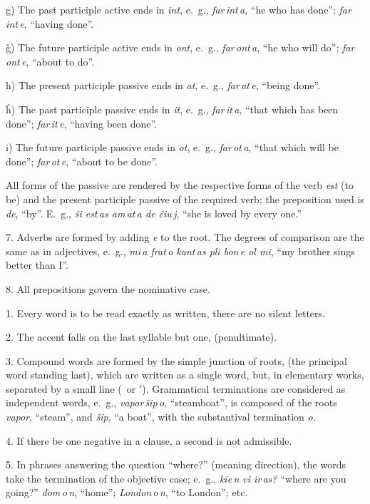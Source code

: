 g) The past participle active ends in \emph{int}, e.~g., \emph{far\,int\,a}, “he who has done”; \emph{far\,int\,e}, “having done”.

ĝ) The future participle active ends in \emph{ont}, e.~g., \emph{far\,ont\,a}, “he who will do”; \emph{far\,ont\,e}, “about to do”.

h) The present participle passive ends in \emph{at}, e.~g., \emph{far\,at\,e}, “being done”.

ĥ) The past participle passive ends in \emph{it}, e.~g., \emph{far\,it\,a}, “that which has been done”; \emph{far\,it\,e}, “having been done”.

i) The future participle passive ends in \emph{ot}, e.~g., \emph{far\,ot\,a}, “that which will be done”; \emph{far\,ot\,e}, “about to be done”.

All forms of the passive are rendered by the respective forms of the verb \emph{est} (to be) and the present participle passive of the required verb; the preposition used is \emph{de}, “by”. E.~g., \emph{ŝi est\,as am\,at\,a de ĉiu\,j}, “she is loved by every one.”

7. Adverbs are formed by adding \emph{e} to the root. The degrees of comparison are the same as in adjectives, e.~g., \emph{mi\,a frat\,o kant\,as pli bon\,e ol mi}, “my brother sings better than I”.

8. All prepositions govern the nominative case.

%
%

1. Every word is to be read exactly as written, there are no silent letters.

2. The accent falls on the last syllable but one, (penultimate).

3. Compound words are formed by the simple junction of roots, (the principal word standing last), which are written as a single word, but, in elementary works, separated by a small line (\, or {$'$}). Grammatical terminations are considered as independent words, e.~g., \emph{vapor\,ŝip\,o}, “steamboat”, is composed of the roots \emph{vapor}, “steam”, and \emph{ŝip}, “a boat”, with the substantival termination \emph{o}.

4. If there be one negative in a clause, a second is not admissible.

5. In phrases answering the question “where?” (meaning direction), the words take the termination of the objective case; e.~g., \emph{kie\,n vi ir\,as?} “where are you going?” \emph{dom\,o\,n}, “home”; \emph{London\,o\,n}, “to London”; etc.

